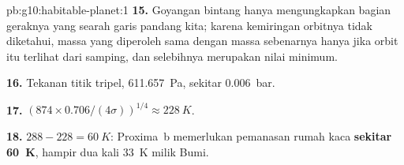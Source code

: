 \begin{solution}{pb:g10:habitable-planet:1}
\textbf{15.} Goyangan bintang hanya mengungkapkan bagian geraknya yang
searah garis pandang kita; karena kemiringan orbitnya tidak diketahui, massa
yang diperoleh sama dengan massa sebenarnya hanya jika orbit itu terlihat dari
samping, dan selebihnya merupakan nilai minimum.

\textbf{16.} Tekanan titik tripel, \qty{611.657}{Pa}, sekitar
\qty{0.006}{bar}.

\textbf{17.} $(874 \times 0.706/(4\sigma))^{1/4} \approx \qty{228}{K}$.

\textbf{18.} $288 - 228 = \qty{60}{K}$: Proxima~b memerlukan pemanasan rumah
kaca \textbf{sekitar \qty{60}{K}}, hampir dua kali \qty{33}{K} milik Bumi.
\end{solution}
